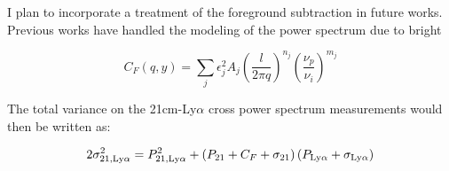 I plan to incorporate a treatment of the foreground subtraction in future works.
Previous works have handled the modeling of the power spectrum due to bright

\begin{equation}
    C_F \left(q, y\right) = \sum_{j} \epsilon_j^2 A_j \left( \frac{l}{2 \pi q} \right)^{n_j} \left( \frac{\nu_p}{\nu_i}\right)^{m_j}
\end{equation}

The total variance on the 21cm-Ly$\alpha$ cross power spectrum measurements would
then be written as:

\begin{equation}
    2 \sigma^2_{21, \rm Ly\alpha} = P^2_{21, \rm Ly\alpha} +
      \left(P_{21} + C_{F} + \sigma_{21} \right) \left( P_{\rm Ly\alpha} + \sigma_{\rm Ly\alpha}\right)
\end{equation}

